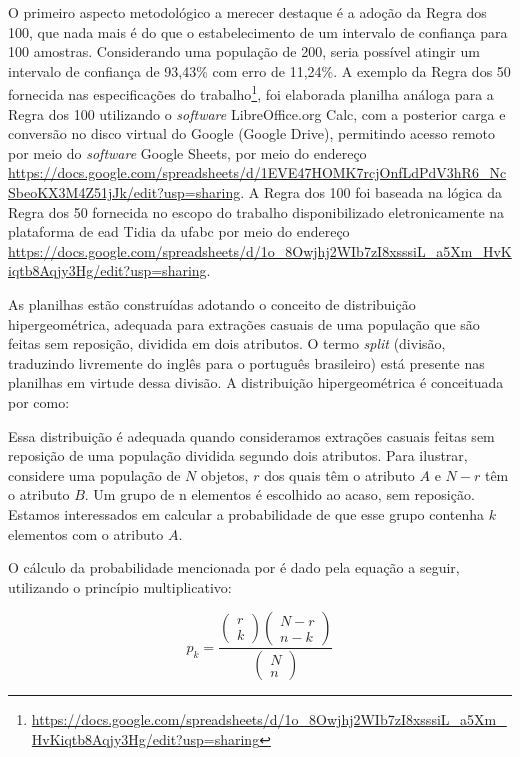 	O primeiro aspecto metodológico a merecer destaque é a adoção da Regra dos 100, que nada mais é do que o estabelecimento de um intervalo de confiança para 100 amostras. Considerando uma população de 200, seria possível atingir um intervalo de confiança de 93,43\% com erro de 11,24\%. A exemplo da Regra dos 50 fornecida nas especificações do trabalho\footnote{\url{https://docs.google.com/spreadsheets/d/1o_8Owjhj2WIb7zI8xsssiL_a5Xm_HvKiqtb8Aqjy3Hg/edit?usp=sharing}}, foi elaborada planilha análoga para a Regra dos 100 utilizando o \textit{software} LibreOffice.org Calc, com a posterior carga e conversão no disco virtual do Google (Google Drive), permitindo acesso remoto por meio do \textit{software} Google Sheets, por meio do endereço \url{https://docs.google.com/spreadsheets/d/1EVE47HOMK7rcjOnfLdPdV3hR6_NcSbeoKX3M4Z51jJk/edit?usp=sharing}. A Regra dos 100 foi baseada na lógica da Regra dos 50 fornecida no escopo do trabalho disponibilizado eletronicamente na plataforma de \gls{ead} Tidia da \gls{ufabc} por meio do endereço \url{https://docs.google.com/spreadsheets/d/1o_8Owjhj2WIb7zI8xsssiL_a5Xm_HvKiqtb8Aqjy3Hg/edit?usp=sharing}.
	
	As planilhas estão construídas adotando o conceito de distribuição hipergeométrica, adequada para extrações casuais de uma população que são feitas sem reposição, dividida em dois atributos. O termo \textit{split} (divisão, traduzindo livremente do inglês para o português brasileiro) está presente nas planilhas em virtude dessa divisão. A distribuição hipergeométrica é conceituada por  como:
	
	\begin{citacao}
	    Essa distribuição é adequada quando consideramos extrações casuais feitas sem reposição de uma população dividida segundo dois atributos. Para ilustrar, considere uma população de $N$ objetos, $r$ dos quais têm o atributo $A$ e $N - r$ têm o atributo $B$. Um grupo de n elementos é escolhido ao acaso, sem reposição. Estamos interessados em calcular a probabilidade de que esse grupo contenha $k$ elementos com o atributo $A$.
	\end{citacao}
	
	O cálculo da probabilidade mencionada por  é dado pela equação a seguir, utilizando o princípio multiplicativo:
	
	\begin{equation}
	    p_k = \dfrac{\begin{pmatrix}
	r \\
	k
	\end{pmatrix}\begin{pmatrix}
	N - r \\
	n - k
	\end{pmatrix}}{\begin{pmatrix}
	N \\
	n
	\end{pmatrix}}
	\end{equation}
	
